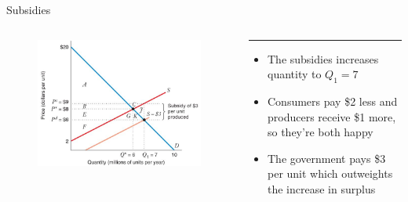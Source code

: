 \documentclass[11pt,t]{beamer}
\begin{document}
\begin{frame}{Subsidies}
  \begin{columns}[T]
    \vspace{0pt}
    \begin{column}{.55\textwidth}
      \begin{figure}
        \includegraphics[width=\textwidth]{figures/fig10_6a.jpg}
      \end{figure}

      \vspace*{50mm} %
    \end{column}
    
    \hfill
    
    \begin{column}{.45\textwidth}
      {\color{accent}\rule{\linewidth}{2pt}}

      \begin{itemize}
        \item The subsidies increases quantity to $Q_1 = 7$
        
        \item Consumers pay \$2 less and producers receive \$1 more, so they're both happy
        
        \item The government pays \$3 per unit which outweights the increase in surplus
      \end{itemize}
    \end{column}
  \end{columns}
\end{frame}
\end{document}
